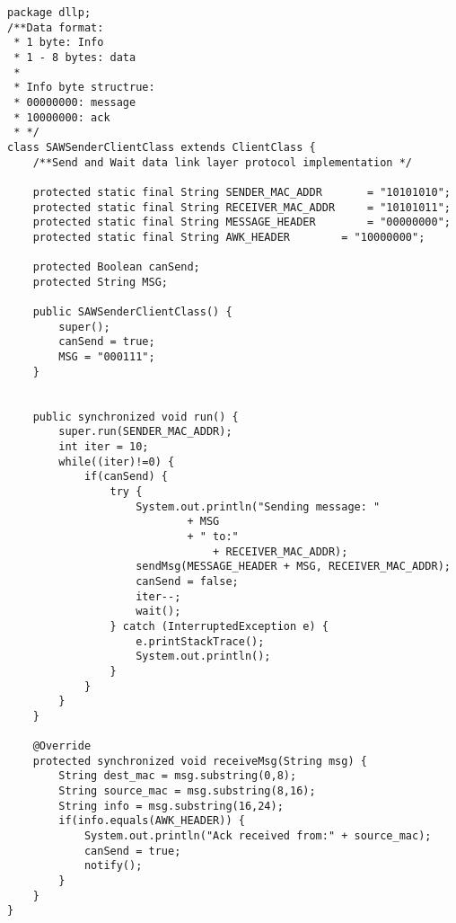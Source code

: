 \begin{verbatim}
package dllp;
/**Data format:
 * 1 byte: Info
 * 1 - 8 bytes: data
 *
 * Info byte structrue:
 * 00000000: message
 * 10000000: ack 
 * */
class SAWSenderClientClass extends ClientClass {
	/**Send and Wait data link layer protocol implementation */
	
	protected static final String SENDER_MAC_ADDR 		= "10101010";
	protected static final String RECEIVER_MAC_ADDR 	= "10101011";
	protected static final String MESSAGE_HEADER 		= "00000000";
	protected static final String AWK_HEADER 		= "10000000";
	
	protected Boolean canSend;
	protected String MSG;

	public SAWSenderClientClass() {
		super();
		canSend = true;
		MSG = "000111";
	}
	

	public synchronized void run() {
		super.run(SENDER_MAC_ADDR);
		int iter = 10;
		while((iter)!=0) {
			if(canSend) {
				try {
					System.out.println("Sending message: " 
							+ MSG 
							+ " to:"
						       	+ RECEIVER_MAC_ADDR);
					sendMsg(MESSAGE_HEADER + MSG, RECEIVER_MAC_ADDR);
					canSend = false;
					iter--;
					wait();
				} catch (InterruptedException e) {
					e.printStackTrace();
					System.out.println();
				}
			}
		}
	}

	@Override
	protected synchronized void receiveMsg(String msg) {
		String dest_mac = msg.substring(0,8);
		String source_mac = msg.substring(8,16);
		String info = msg.substring(16,24);
		if(info.equals(AWK_HEADER)) {
			System.out.println("Ack received from:" + source_mac);
			canSend = true;
			notify();
		}
	}
}
\end{verbatim}
